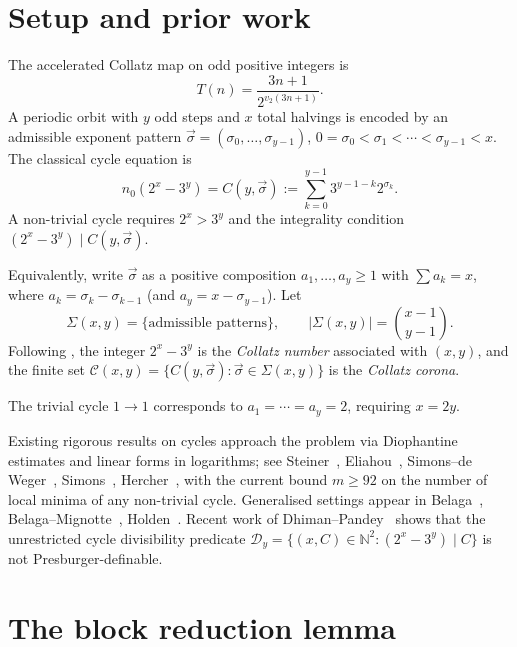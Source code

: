 \documentclass[11pt,a4paper]{article}
\theoremstyle{plain}
\theoremstyle{definition}
\begin{document}
\section{Setup and prior work}

The accelerated Collatz map on odd positive integers is
\[
T(n) = \frac{3n + 1}{2^{v_2(3n + 1)}}.
\]
A periodic orbit with $y$ odd steps and $x$ total halvings is encoded by an
admissible exponent pattern
$\vec\sigma = (\sigma_0, \ldots, \sigma_{y-1})$,
$0 = \sigma_0 < \sigma_1 < \cdots < \sigma_{y-1} < x$.
The classical cycle equation \cite{bohm1978,lagarias1985} is
\begin{equation}\label{eq:cycle}
n_0 (2^x - 3^y) = C(y, \vec\sigma) := \sum_{k=0}^{y-1} 3^{y-1-k} 2^{\sigma_k}.
\end{equation}
A non-trivial cycle requires $2^x > 3^y$ and the integrality condition
$(2^x - 3^y) \mid C(y, \vec\sigma)$.

Equivalently, write $\vec\sigma$ as a positive composition $a_1, \ldots, a_y \ge 1$
with $\sum a_k = x$, where $a_k = \sigma_k - \sigma_{k-1}$ (and $a_y = x - \sigma_{y-1}$). Let
\[
\Sigma(x, y) = \{\text{admissible patterns}\}, \qquad |\Sigma(x, y)| = \binom{x-1}{y-1}.
\]
Following \cite{belaga1998}, the integer $2^x - 3^y$ is the \emph{Collatz number}
associated with $(x, y)$, and the finite set
$\mathcal{C}(x, y) = \{C(y, \vec\sigma) : \vec\sigma \in \Sigma(x, y)\}$
is the \emph{Collatz corona}.

The trivial cycle $1 \to 1$ corresponds to $a_1 = \cdots = a_y = 2$, requiring
$x = 2y$.

Existing rigorous results on cycles approach the problem via Diophantine
estimates and linear forms in logarithms; see Steiner~\cite{steiner1977},
Eliahou~\cite{eliahou1993}, Simons--de Weger~\cite{sdw2005}, Simons~\cite{simons2008},
Hercher~\cite{hercher2022}, with the current bound $m \ge 92$ on the number
of local minima of any non-trivial cycle. Generalised settings appear in
Belaga~\cite{belaga2003}, Belaga--Mignotte~\cite{belaga2006},
Holden~\cite{holden2011}. Recent work of Dhiman--Pandey~\cite{dhiman2026}
shows that the unrestricted cycle divisibility predicate
$\mathcal{D}_y = \{(x, C) \in \mathbb{N}^2 : (2^x - 3^y) \mid C\}$
is not Presburger-definable.


\section{The block reduction lemma}\label{sec:block}
\end{document}
